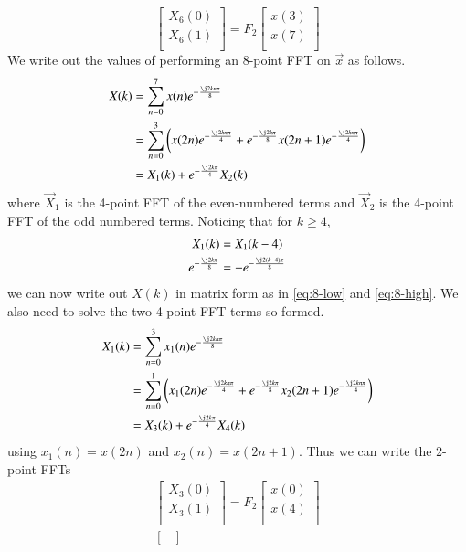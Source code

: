 \documentclass[journal,12pt,twocolumn]{IEEEtran}
\renewcommand\thesection{\arabic{section}}
\begin{document}
\begin{enumerate}[label=\arabic*.,ref=\thesection.\theenumi]
\begin{equation}
\begin{bmatrix}
X_{6}(0) \\ 
X_{6}(1)\\ 
\end{bmatrix}
= F_{2}
\begin{bmatrix}
x(3) \\ 
x(7) \\ 
\end{bmatrix}
\end{equation}
\solution We write out the values of performing an 8-point FFT on $\vec{x}$ as follows.
\begin{align}
	X(k) &= \sum_{n = 0}^{7}x(n)e^{-\frac{\j2kn\pi}{8}} \\
		 &= \sum_{n = 0}^{3}\brak{x(2n)e^{-\frac{\j2kn\pi}{4}} + e^{-\frac{\j2k\pi}{8}}x(2n + 1)e^{-\frac{\j2kn\pi}{4}}} \\
		 &= X_1(k) + e^{-\frac{\j2k\pi}{4}}X_2(k) 
\end{align}
where $\vec{X}_1$ is the 4-point FFT of the even-numbered terms and $\vec{X}_2$ is the 4-point FFT of the odd numbered terms. Noticing that for $k \geq 4$,
\begin{align}
	X_1(k) &= X_1(k - 4) \\
	e^{-\frac{\j2k\pi}{8}} &= -e^{-\frac{\j2(k - 4)\pi}{8}}
\end{align}
we can now write out $X(k)$ in matrix form as in \eqref{eq:8-low} and \eqref{eq:8-high}. We also need to solve the two 4-point FFT terms so formed.
\begin{align}
	X_1(k) &= \sum_{n = 0}^{3}x_1(n)e^{-\frac{\j2kn\pi}{8}} \\
		 &= \sum_{n = 0}^{1}\brak{x_1(2n)e^{-\frac{\j2kn\pi}{4}} + e^{-\frac{\j2k\pi}{8}}x_2(2n + 1)e^{-\frac{\j2kn\pi}{4}}} \\
		 &= X_3(k) + e^{-\frac{\j2k\pi}{4}}X_4(k) 
\end{align}
using $x_1(n) = x(2n)$ and $x_2(n) = x(2n + 1)$. Thus we can write the 2-point FFTs
\begin{align}
\begin{bmatrix}
X_{3}(0) \\ 
X_{3}(1)\\ 
\end{bmatrix}
= F_{2}
\begin{bmatrix}
x(0) \\ 
x(4) \\ 
\end{bmatrix} \\
\begin{bmatrix}

\end{bmatrix}
\end{align}
\end{enumerate}
\end{document}
